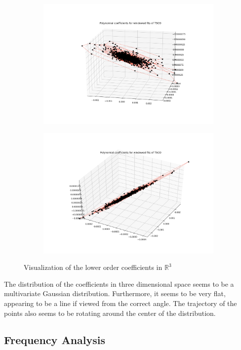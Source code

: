 \documentclass[final]{article}
\begin{document}
\begin{figure}[H]
  \centering
  \begin{subfigure}{.45\textwidth}
    \centering
    \includegraphics[width=\linewidth]{img/coeff1}
  \end{subfigure}
  \begin{subfigure}{.45\textwidth}
    \centering
    \includegraphics[width=\linewidth]{img/coeff2}
  \end{subfigure}
  \caption{Visualization of the lower order coefficients in $\mathbb{R}^3$}
  \label{fig:coeff}
\end{figure}

The distribution of the coefficients in three dimensional space seems to be a
multivariate Gaussian distribution. Furthermore, it seems to be very flat,
appearing to be a line if viewed from the correct angle. The trajectory of the
points also seems to be rotating around the center of the distribution.

\subsection{Frequency Analysis}
\end{document}
